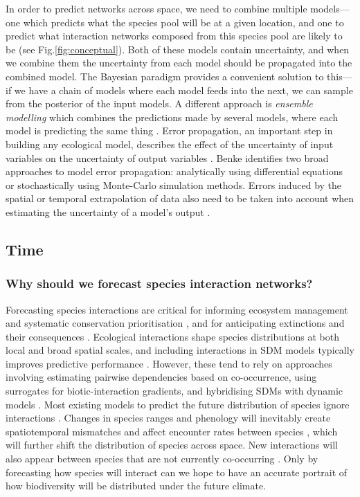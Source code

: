 In order to predict networks across space, we need to combine multiple
models---one which predicts what the species pool will be at a given
location, and one to predict what interaction networks composed from
this species pool are likely to be (see Fig.\ref{fig:conceptual}). Both of these
models contain uncertainty, and when we combine them the uncertainty
from each model should be propagated into the combined model. The
Bayesian paradigm provides a convenient solution to this---if we have a
chain of models where each model feeds into the next, we can sample from
the posterior of the input models. A different approach is
\emph{ensemble modelling} which combines the predictions made by several
models, where each model is predicting the same thing
\cite{Parker2013EnsMod}. Error propagation, an important step in
building any ecological model, describes the effect of the uncertainty
of input variables on the uncertainty of output variables
\cite{Draper1995AssPro, Parysow2000EffApp}. Benke\cite{Benke2018ErrPro} identifies
two broad approaches to model error propagation: analytically using
differential equations or stochastically using Monte-Carlo simulation
methods. Errors induced by the spatial or temporal extrapolation of data
also need to be taken into account when estimating the uncertainty of a
model's output \cite{Peters2004StrEco}.

\subsection{Time}\label{time}

\subsubsection{Why should we forecast species interaction
networks?}\label{why-should-we-forecast-species-interaction-networks}

Forecasting species interactions are critical for informing ecosystem
management \cite{Harvey2017BriEco} and systematic conservation
prioritisation \cite{Pollock2020ProBio}, and for anticipating
extinctions and their consequences \cite{@McDonald-Madden2016UsiFoo,
McWilliams2019StaMul}. Ecological interactions shape species
distributions at both local and broad spatial scales, and including
interactions in SDM models typically improves predictive performance
\cite{Araujo2007ImpBio, Wisz2013RolBio, Pigot2013SpeInt}. However,
these tend to rely on approaches involving estimating pairwise
dependencies based on co-occurrence, using surrogates for
biotic-interaction gradients, and hybridising SDMs with dynamic models
\cite{Wisz2013RolBio}. Most existing models to predict the future
distribution of species ignore interactions \cite{Urban2016ImpFor}.
Changes in species ranges and phenology will inevitably create
spatiotemporal mismatches and affect encounter rates between species
\cite{Gilman2010FraCom}, which will further shift the distribution of
species across space. New interactions will also appear between species
that are not currently co-occurring \cite{Gilman2010FraCom}. Only by
forecasting how species will interact can we hope to have an accurate
portrait of how biodiversity will be distributed under the future
climate.

